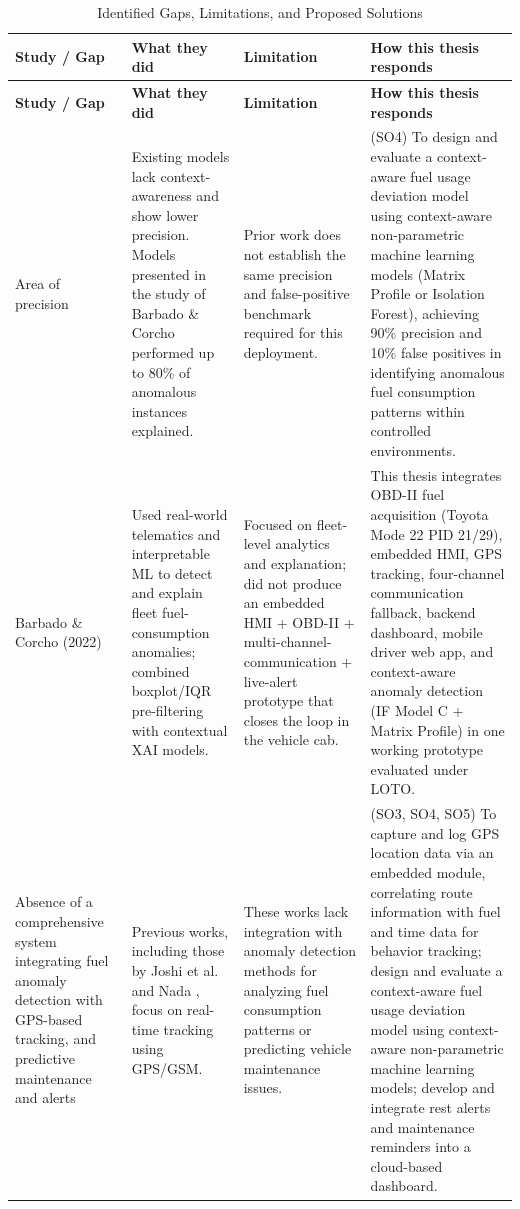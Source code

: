 \FloatBarrier
{\scriptsize
\setlength{\tabcolsep}{3pt}
\renewcommand{\arraystretch}{0.95}
\begin{longtable}{|p{}|p{}|p{}|p{}|}
\caption{Identified Gaps, Limitations, and Proposed Solutions}
\label{tab:identifiedgaps} \\
\hline
\textbf{Study / Gap} & \textbf{What they did} & \textbf{Limitation} & \textbf{How this thesis responds} \\
\hline
\endfirsthead

\hline
\textbf{Study / Gap} & \textbf{What they did} & \textbf{Limitation} & \textbf{How this thesis responds} \\
\hline
\endhead

Area of precision & Existing models lack context-awareness and show lower precision. Models presented in the study of Barbado \& Corcho \cite{barbado2022interpretable} performed up to 80\% of anomalous instances explained. & Prior work does not establish the same precision and false-positive benchmark required for this deployment. & (SO4) To design and evaluate a context-aware fuel usage deviation model using context-aware non-parametric machine learning models (Matrix Profile or Isolation Forest), achieving 90\% precision and 10\% false positives in identifying anomalous fuel consumption patterns within controlled environments. \\
\hline

Barbado \& Corcho (2022) \cite{barbado2022interpretable} & Used real-world telematics and interpretable ML to detect and explain fleet fuel-consumption anomalies; combined boxplot/IQR pre-filtering with contextual XAI models. & Focused on fleet-level analytics and explanation; did not produce an embedded HMI + OBD-II + multi-channel-communication + live-alert prototype that closes the loop in the vehicle cab. & This thesis integrates OBD-II fuel acquisition (Toyota Mode 22 PID 21/29), embedded HMI, GPS tracking, four-channel communication fallback, backend dashboard, mobile driver web app, and context-aware anomaly detection (IF\glsadd{IF} Model C + Matrix Profile) in one working prototype evaluated under LOTO\glsadd{LOTO}. \\
\hline

Absence of a comprehensive system integrating fuel anomaly detection with GPS-based tracking, and predictive maintenance and alerts & Previous works, including those by Joshi et al. \cite{joshi2024intelligent} and Nada \cite{nada2017design}, focus on real-time tracking using GPS/GSM. & These works lack integration with anomaly detection methods for analyzing fuel consumption patterns or predicting vehicle maintenance issues. & (SO3, SO4, SO5) To capture and log GPS location data via an embedded module, correlating route information with fuel and time data for behavior tracking; design and evaluate a context-aware fuel usage deviation model using context-aware non-parametric machine learning models; develop and integrate rest alerts and maintenance reminders into a cloud-based dashboard. \\
\hline


\end{longtable}}
